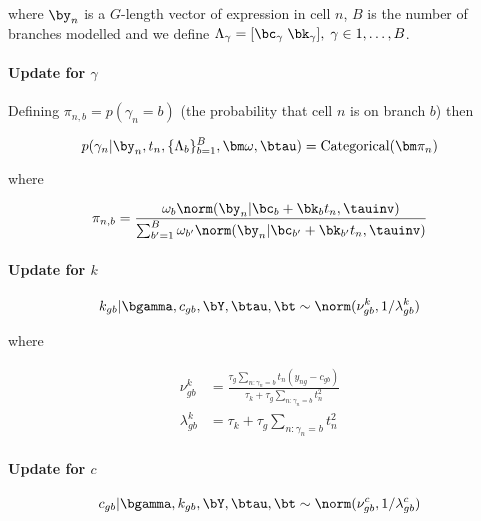 where $\by_n$ is a $G$-length vector of expression in cell $n$, $B$ is the number of branches modelled and we define $\Lambda_\gamma = [ \bc_\gamma \; \bk_\gamma], \; \gamma \in 1, \ldots, B$.

\paragraph{Update for $\gamma$}

Defining $\pi_{n,b} = p(\gamma_n = b)$ (the probability that cell $n$ is on branch $b$) then

\begin{equation}
  p(\gamma_n | \by_n, t_n, \{ \Lambda_b \}_{b=1}^B, \bm \omega, \btau) = \text{Categorical}(\bm \pi_{n})
\end{equation}

where

\begin{equation}
  \pi_{n,b} = \frac{\omega_b \norm(\by_n | \bc_b + \bk_b t_n, \tauinv)}
  {\sum_{b'=1}^B \omega_{b'} \norm(\by_n | \bc_{b'} + \bk_{b'} t_n, \tauinv) }
\end{equation}

\paragraph{Update for $k$}

\begin{equation}
  k_{gb} | \bgamma, c_{gb}, \bY, \btau, \bt \sim \norm(\nu^k_{gb}, 1 / \lambda^k_{gb})
\end{equation}

where

\begin{equation}
\begin{aligned}
\nu^k_{gb} & = \frac{\tau_g \sum_{n:\gamma_n = b}  t_n (y_{ng} - c_{gb})}{\tau_k +  \tau_g \sum_{n:\gamma_n = b}  t_n^2}\\
\lambda^k_{gb} & = \tau_k +  \tau_g \sum_{n:\gamma_n = b}  t_n^2
\end{aligned}
\end{equation}

\paragraph{Update for $c$}

\begin{equation}
  c_{gb} | \bgamma, k_{gb}, \bY, \btau, \bt \sim \norm(\nu^c_{gb}, 1 / \lambda^c_{gb})
\end{equation}

